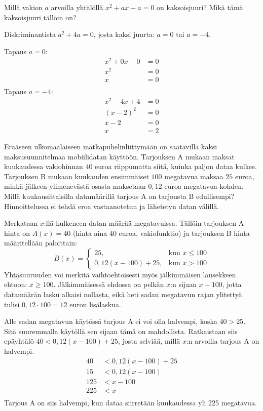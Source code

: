 \begin{tehtava}
Millä vakion $a$ arvoilla yhtälöllä $x^2+ax-a=0$ on kaksoisjuuri? Mikä tämä kaksoisjuuri tällöin on?
	\begin{vastaus}
Diskriminantista $a^2+4a=0$, josta kaksi juurta: $a=0$ tai $a=-4$.

Tapaus $a=0$:
\begin{align*}
x^2+0x-0&=0 \\
x^2&=0 \\
x&=0 \\
\end{align*}
Tapaus $a=-4$:
\begin{align*}
x^2-4x+4&=0 \\
(x-2)^2&=0 \\
x-2&=0 \\
x&=2
\end{align*}
	\end{vastaus}
\end{tehtava}

\begin{tehtava} %
Erääseen ulkomaalaiseen matkapuhelinliittymään on saatavilla kaksi maksusuunnitelmaa mobiilidatan käyttöön. Tarjouksen A mukaan maksat kuukaudessa vakiohinnan $40$ euroa riippumatta siitä, kuinka paljon dataa kulkee. Tarjouksen B mukaan kuukauden ensimmäiset $100$ megatavua maksaa $25$ euroa, minkä jälkeen ylimenevästä osasta maksetaan $0,12$ euroa megatavua kohden. Millä kuukausittaisilla datamäärillä tarjous A on tarjousta B edullisempi? Hinnoittelussa ei tehdä eroa vastaanotetun ja lähetetyn datan välillä.
	\begin{vastaus}
	Merkataan $x$:llä kulkeneen datan määrää megatavuissa. Tällöin tarjouksen A hinta on $A(x)=40$ (hinta aina $40$ euroa, vakiofunktio) ja tarjouksen B hinta määritellään paloittain:
	$$B(x)=\begin{cases}
	25, & \mbox{kun } x\leq 100 \\
	0,12(x-100)+25, & \mbox{kun } x>100
	\end{cases}$$
Yhtäsuuruuden voi merkitä vaihtoehtoisesti myös jälkimmäisen lausekkeen ehtoon: $x\geq 100$. Jälkimmäisessä ehdossa on pelkän $x$:n sijaan $x-100$, jotta datamäärän lasku alkaisi nollasta, eikä heti sadan megatavun rajan ylitettyä tulisi $0,12\cdot 100=12$ euron lisälaskua.

Alle sadan megatavun käytössä tarjous A ei voi olla halvempi, koska $40>25$. Sitä suuremmalla käytöllä sen sijaan tämä on mahdollista. Ratkaistaan siis epäyhtälö $40<0,12(x-100)+25$, josta selviää, millä $x$:n arvoilla tarjous A on halvempi.
\begin{align*}
40&<0,12(x-100)+25 \\
15 &<0,12(x-100) \\
125&<x-100 \\
225&<x \\
\end{align*}
	Tarjous A on siis halvempi, kun dataa siirretään kuukaudessa yli 225 megatavua.
	\end{vastaus}
\end{tehtava}

